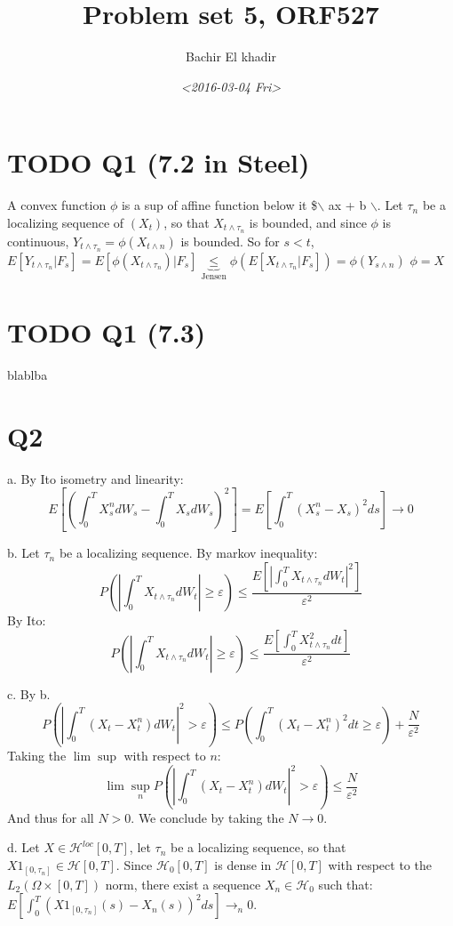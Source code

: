 \documentclass[11pt]{article}
\author{Bachir El khadir}
\date{\textit{<2016-03-04 Fri>}}
\title{Problem set 5, ORF527}
\begin{document}
\maketitle

\section{{\bfseries\sffamily TODO} Q1 (7.2 in Steel)}
\label{sec:orgheadline1}
A convex function \(\phi\) is a sup of affine function below it \$$\backslash${ ax + b $\backslash$}.
Let \(\tau_n\) be a localizing sequence of \((X_t)\), so that \(X_{t \wedge \tau_n}\) is bounded, and since \(\phi\) is continuous, \(Y_{t \wedge \tau_n} = \phi(X_{t \wedge n})\) is bounded.
So for \(s < t\), \(E[Y_{t \wedge \tau_n} | F_s] = E[\phi(X_{t \wedge \tau_n}) | F_s] \underbrace{\le}_{\text{Jensen}} \phi(E[X_{t \wedge \tau_n} | F_s]) = \phi(Y_{s \wedge n})\)
\(\phi = X\)

\section{{\bfseries\sffamily TODO} Q1 (7.3)}
\label{sec:orgheadline2}
blablba

\section{Q2}
\label{sec:orgheadline3}
a. By Ito isometry and linearity:
$$E[ (\int_0^T X_s^n dW_s - \int_0^T X_s dW_s)^2 ] =  E[ \int_0^T (X_s^n - X_s)^2 ds ] \rightarrow 0$$

b. Let \(\tau_n\) be a localizing sequence.
By markov inequality:
$$P(|\int_0^T X_{t \wedge \tau_n} dW_t| \ge \varepsilon) \le \frac{E[|\int_0^T X_{t \wedge \tau_n} dW_t|^2]}{\varepsilon^2}$$
By Ito:
$$P(|\int_0^T X_{t \wedge \tau_n} dW_t| \ge \varepsilon) \le \frac{E[\int_0^T X^2_{t \wedge \tau_n} dt]}{\varepsilon^2}$$

c. By b.
$$P(|\int_0^T (X_t - X^n_t) dW_t|^2 > \varepsilon) \le P(\int_0^T (X_t - X^n_t)^2 dt \ge \varepsilon) + \frac N{\varepsilon^2}$$
Taking the \(\lim\sup\) with respect to \(n\):
  $$\lim\sup_n P(|\int_0^T (X_t - X^n_t) dW_t|^2 > \varepsilon) \le \frac N{\varepsilon^2}$$
  And thus for all \(N > 0\). We conclude by taking the \(N \rightarrow 0\).

d. Let \(X \in \mathcal H^{loc}[0, T]\), let \(\tau_n\) be a localizing sequence, so that \(X1_{[0, \tau_n]} \in \mathcal H[0, T]\).
Since \(\mathcal H_0[0, T]\) is dense in \(\mathcal H[0, T]\) with respect to the \(L_2(\Omega \times [0, T])\) norm, there exist a sequence \(X_n \in \mathcal H_0\) such that:
\(E[\int_0^T (X1_{[0, \tau_n]}(s) - X_n(s))^2 ds] \rightarrow_n 0\).
\end{document}
